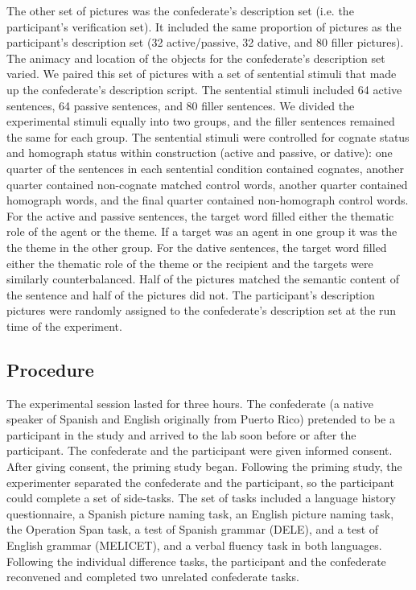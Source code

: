 The other set of pictures was the confederate's description set (i.e. the participant's verification set). It included the same proportion of pictures as the participant's description set (32 active\slash passive, 32 dative, and 80 filler pictures). The animacy and location of the objects for the confederate's description set varied. We paired this set of pictures with a set of sentential stimuli that made up the confederate's description script. The sentential stimuli included 64 active sentences, 64 passive sentences, and 80 filler sentences. We divided the experimental stimuli equally into two groups, and the filler sentences remained the same for each group. The sentential stimuli were controlled for cognate status and homograph status within construction (active and passive, or dative): one quarter of the sentences in each sentential condition contained cognates, another quarter contained non-cognate matched control words, another quarter contained homograph words, and the final quarter contained non-homograph control words. For the active and passive sentences, the target word filled either the thematic role of the agent or the theme. If a target was an agent in one group it was the the theme in the other group. For the dative sentences, the target word filled either the thematic role of the theme or the recipient and the targets were similarly counterbalanced. Half of the pictures matched the semantic content of the sentence and half of the pictures did not. The participant's description pictures were randomly assigned to the confederate's description set at the run time of the experiment. 

\subsection{Procedure}
\label{procedure}

The experimental session lasted for three hours. The confederate (a native speaker of Spanish and English originally from Puerto Rico) pretended to be a participant in the study and arrived to the lab soon before or after the participant. The confederate and the participant were given informed consent. After giving consent, the priming study began. Following the priming study, the experimenter separated the confederate and the participant, so the participant could complete a set of side-tasks. The set of tasks included a language history questionnaire, a Spanish picture naming task, an English picture naming task, the Operation Span task, a test of Spanish grammar (DELE), and a test of English grammar (MELICET), and a verbal fluency task in both languages. Following the individual difference tasks, the participant and the confederate reconvened and completed two unrelated confederate tasks.


